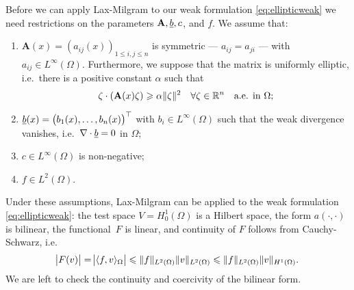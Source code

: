 \documentclass[thesis.tex]{subfiles}
\begin{document}
Before we can apply  Lax-Milgram to our weak formulation \eqref{eq:ellipticweak} we need restrictions on the parameters $\mathbf{A}, \underline{b}, c$, and $f$. We assume that:
\begin{enumerate}[label=(\alph*)]
  \item $\mathbf{A}(x) = (a_{ij}(x))_{1 \leq i,j \leq n}$ is symmetric --- $a_{ij} = a_{ji}$ --- with $a_{ij} \in L^{\infty}(\Omega)$. Furthermore, we suppose that the matrix is uniformly elliptic, i.e.~there is a positive constant $\alpha$ such that 
\[
  \zeta \cdot (\mathbf{A}(x) \zeta) \geqslant \alpha \|\zeta\|^2 \quad \forall \zeta \in \mathbb{R}^n \quad \text{a.e. in } \Omega;
\]
\item $\underline{b}(x) = \left(b_1(x), \dots, b_n(x)\right)^\top$ with $b_i \in L^\infty(\Omega)$ such that the weak divergence vanishes, i.e.~$\nabla \cdot \underline{b} = 0$ in $\Omega$;
\item $c \in L^\infty(\Omega)$ is non-negative;
\item $f  \in L^2(\Omega)$.
\end{enumerate}
Under these assumptions, Lax-Milgram can be applied to the weak formulation \eqref{eq:ellipticweak}: the test space $V = H_0^1(\Omega)$ is
a Hilbert space, the form $a(\cdot, \cdot)$ is bilinear, the functional~$F$ is linear, 
and continuity of $F$ follows from Cauchy-Schwarz, i.e. 
\[
\abs{F(v)} = \abs{\langle f,v \rangle_\Omega} \leqslant \|f\|_{L^2(\Omega)} \|v\|_{L^2(\Omega)} \leqslant \|f\|_{L^2(\Omega)} \|v\|_{H^1(\Omega)}.
\]
We are left to check the continuity and coercivity of the bilinear form.
\end{document}
